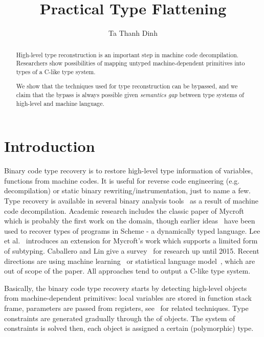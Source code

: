 \documentclass[a4paper]{llncs}
\begin{document}
%
\title{Practical Type Flattening}
%
%
\author{Ta Thanh Dinh}
%
%
%
\maketitle              %
%
\begin{abstract}
High-level type reconstruction is an important step in machine code decompilation.
Researchers show possibilities of mapping untyped machine-dependent
primitives into types of a C-like type system.


We show that the techniques used for type reconstruction can be bypassed,
and we claim that the bypass is always possible given \emph{semantics gap} between
type systems of high-level and machine language.
\end{abstract}
%
%
%
\section{Introduction}
Binary code type recovery is to restore high-level type information of variables,
functions from machine codes. It is useful for reverse code engineering (e.g.
decompilation) or static binary rewriting/instrumentation, just to name a few.
Type recovery is available in several binary analysis
tools~\cite{noauthor_hex-rays_nodate, noauthor_jeb_nodate, noauthor_ghidra_nodate}
as a result of machine code decompilation. Academic research includes the classic
paper of Mycroft~\cite{mycroft_type-based_1999} which is probably the first work
on the domain, though earlier ideas~\cite{shivers_data-flow_1990} have been used
to recover types of programs in Scheme - a dynamically typed language.
Lee et al.~\cite{lee_tie_2011} introduces
an extension for Mycroft's work which supports a limited form of subtyping.
Caballero and Lin give a survey~\cite{caballero_type_2016} for research up until 2015.
Recent directions are using machine learning~\cite{maier_typeminer_2019} or statistical
language model~\cite{katz_estimating_2016}, which are out of scope of the paper.
All approaches tend to output a C-like type system.

Basically, the binary code type recovery starts by detecting high-level objects from
machine-dependent primitives: local variables are stored in function stack frame,
parameters are passed from registers, see~\cite{balakrishnan_wysinwyx_2007} for related techniques.
Type constraints are generated gradually through the  of objects.
The system of constraints is solved then, each object is assigned a certain
(polymorphic) type.
\end{document}

